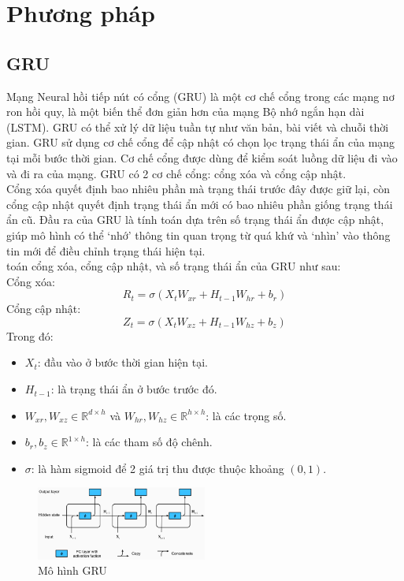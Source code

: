 \documentclass[conference]{IEEEtran}
\begin{document}
\section{Phương pháp}

\subsection{GRU}
Mạng Neural hồi tiếp nút có cổng (GRU) là một cơ chế cổng trong các mạng nơ ron hồi quy, là một biến thể đơn giản hơn của mạng Bộ nhớ ngắn hạn dài (LSTM). GRU có thể xử lý dữ liệu tuần tự như văn bản, bài viết và chuỗi thời gian.
GRU sử dụng cơ chế cổng để cập nhật có chọn lọc trạng thái ẩn của mạng tại mỗi bước thời gian. Cơ chế cổng được dùng để kiểm soát luồng dữ liệu đi vào và đi ra của mạng. GRU có 2 cơ chế cổng: cổng xóa và cổng cập nhật. \\
Cổng xóa quyết định bao nhiêu phần mà trạng thái trước đây được giữ lại, còn cổng cập nhật quyết định trạng thái ẩn mới có bao nhiêu phần giống trạng thái ẩn cũ. Đầu ra của GRU là tính toán dựa trên số trạng thái ẩn được cập nhật, giúp mô hình có thể ‘nhớ’ thông tin quan trọng từ quá khứ và ‘nhìn’ vào thông tin mới để điều chỉnh trạng thái hiện tại.\\ toán cổng xóa, cổng cập nhật, và số trạng thái ẩn của GRU như sau:\\
Cổng xóa:
\[
R_t = \sigma(X_t W_{xr} + H_{t-1} W_{hr} + b_r)
\]
Cổng cập nhật:
\[
Z_t = \sigma(X_t W_{xz} + H_{t-1} W_{hz} + b_z)
\]
Trong đó:\\
\begin{itemize}
    \item $X_t$: đầu vào ở bước thời gian hiện tại.
    \item $H_{t-1}$: là trạng thái ẩn ở bước trước đó.
    \item $W_{xr}, W_{xz} \in \mathbb{R}^{d \times h}$ và $W_{hr}, W_{hz} \in \mathbb{R}^{h \times h}$: là các trọng số.
    \item $b_r, b_z \in \mathbb{R}^{1 \times h}$: là các tham số độ chênh.
    \item $\sigma$: là hàm sigmoid để 2 giá trị thu được thuộc khoảng $(0,1)$.
\end{itemize}

\vspace{-1em} %
\begin{figure}[H]
    \centering
    \includegraphics[width=0.5\textwidth]{bibliography/Figure/GRUModel.png}
    \caption{Mô hình GRU}
    \label{fig:GRU_Model}
\end{figure}
\end{document}
